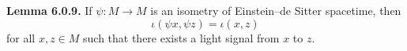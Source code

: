 \textbf{Lemma 6.0.9.} If $\psi: M \to M$ is an isometry of Einstein--de Sitter spacetime, then
$$\iota(\psi x, \psi z) = \iota(x, z)$$
for all $x, z \in M$ such that there exists a light signal from $x$ to $z$.
